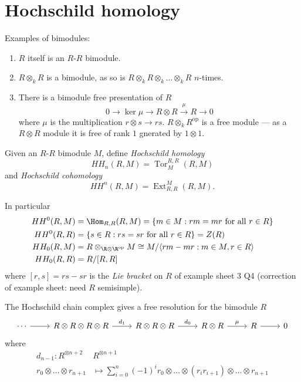 \documentclass[a4paper]{article}
\DeclareMathOperator{\Tor}{Tor}
\DeclareMathOperator{\Ext}{Ext}
\begin{document}


\tableofcontents

\section{Hochschild homology}

\begin{eg}
  Examples of bimodules:
  \begin{enumerate}
  \item \(R\) itself is an \(R\)-\(R\) bimodule.
  \item \(R \otimes_k R\) is a bimodule, as so is \(R \otimes_k R \otimes_k \dots \otimes_k R\) \(n\)-times.
  \item There is a bimodule free presentation of \(R\)
    \[
      0 \to \ker \mu \to R \otimes R \xrightarrow{\mu} R \to 0
    \]
    where \(\mu\) is the multiplication \(r \otimes s \to rs\). \(R \otimes_k R^{\text{op}}\) is a free module --- as a \(R \otimes R\) module it is free of rank \(1\) gnerated by \(1 \otimes 1\).
  \end{enumerate}
\end{eg}

\begin{definition}
  Given an \(R\)-\(R\) bimodule \(M\), define \emph{Hochschild homology}
  \[
    HH_n(R, M) = \Tor_M^{R, R} (R, M)
  \]
  and \emph{Hochschild cohomology}
  \[
    HH^n(R, M) = \Ext_{R, R}^M(R, M).
  \]
\end{definition}

In particular
\begin{align*}
  HH^0(R, M) &= \Hom_{R, R} (R, M) = \{m \in M: rm = mr \text{ for all } r \in R\} \\
  HH^0(R, R) &= \{s \in R: rs = sr \text{ for all } r \in R\} = Z(R) \\
  HH_0(R, M) &= R \otimes_{\R \otimes \R^{\text{op}}} M \cong M / \langle rm - mr: m \in M, r \in R \rangle \\
  HH_0(R, R) &= R/[R, R]
\end{align*}
where \([r, s] = rs - sr\) is the \emph{Lie bracket} on \(R\) of example sheet 3 Q4 (correction of example sheet: need \(R\) semisimple).

\begin{definition}
  The Hochschild chain complex gives a free resolution for the bimodule \(R\)
  \[
    \begin{tikzcd}
      \cdots \ar[r] & R \otimes R \otimes R \otimes R \ar[r, "d_1"] & R \otimes R \otimes R \ar[r, "d_0"] & R \otimes R \ar[r, "\mu"] & R \ar[r] & 0
    \end{tikzcd}
  \]
  where
  \begin{align*}
    d_{n - 1}: R^{\otimes n + 2} & R^{\otimes n + 1} \\
    r_0 \otimes \dots \otimes r_{n + 1} &\mapsto \sum_{i = 0}^n (-1)^i r_0 \otimes \dots \otimes (r_ir_{i + 1}) \otimes \dots \otimes r_{n + 1}
  \end{align*}
\end{definition}
\end{document}
